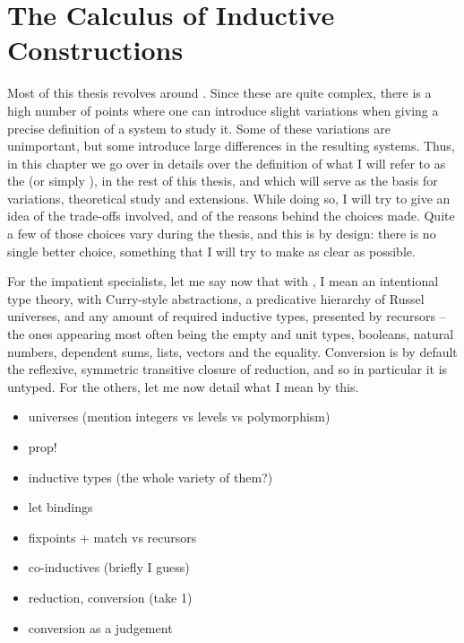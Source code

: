 \chapter{The Calculus of Inductive Constructions}
\label{chap:tech-intro}

Most of this thesis revolves around .
Since these are
quite complex, there is a high number of points where one can introduce slight variations
when giving a precise definition of a system to study it.
Some of these variations are unimportant, but some introduce large differences in the
resulting systems. Thus, in this chapter we go over in details over
the definition of what I will refer to as the
 (or simply ), in the rest of this
thesis, and which will serve as the basis for variations, theoretical study and extensions.
While doing so, I will try to give an idea of the trade-offs involved, and of the reasons
behind the choices made. Quite a few of those choices vary during the thesis,
and this is by design: there is no single better choice, 
something that I will try to make as clear as possible.

For the impatient specialists, let me say now that with , I
mean an intentional type theory, with Curry-style abstractions,
a predicative hierarchy of Russel universes,
and any amount of required inductive types, presented by recursors – 
the ones appearing most often being the empty and
unit types, booleans, natural numbers, dependent sums, lists, vectors and the equality.
Conversion is by default the reflexive, symmetric transitive closure of reduction, and
so in particular it is untyped. For the others, let me now detail what I mean by this.

\begin{itemize}
  \item universes (mention integers vs levels vs polymorphism)
  \item prop!
  \item inductive types (the whole variety of them?)
  \item let bindings
  \item fixpoints + match vs recursors
  \item co-inductives (briefly I guess)
  \item reduction, conversion (take 1)
  \item conversion as a judgement
\end{itemize}

